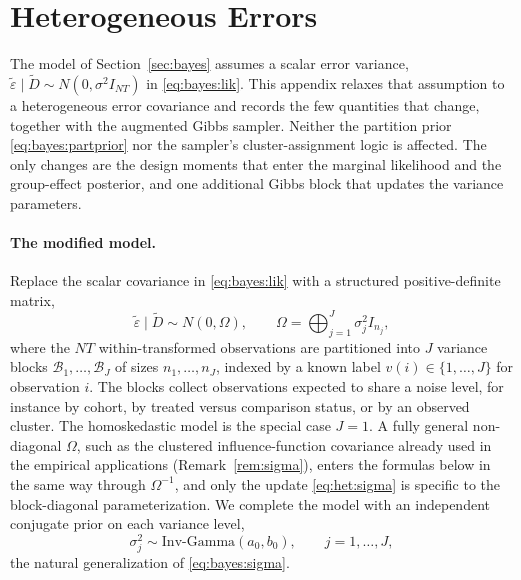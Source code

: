 \documentclass[margin=5in, 12pt]{article}
\newcommand{\1}{\mathbbm{1}}
\begin{document}
\section{Heterogeneous Errors}
\label{app:hetero}

The model of Section~\ref{sec:bayes} assumes a scalar error variance, $\tilde\varepsilon \mid \tilde D \sim N(0,\sigma^2 I_{NT})$ in \eqref{eq:bayes:lik}. This appendix relaxes that assumption to a heterogeneous error covariance and records the few quantities that change, together with the augmented Gibbs sampler. Neither the partition prior \eqref{eq:bayes:partprior} nor the sampler's cluster-assignment logic is affected. The only changes are the design moments that enter the marginal likelihood and the group-effect posterior, and one additional Gibbs block that updates the variance parameters.

\paragraph{The modified model.} Replace the scalar covariance in \eqref{eq:bayes:lik} with a structured positive-definite matrix,
\begin{equation}
  \tilde\varepsilon \mid \tilde D \sim N(0,\Omega), \qquad \Omega = \bigoplus_{j=1}^{J}\sigma_j^2 I_{n_j},
  \label{eq:het:cov}
\end{equation}
where the $NT$ within-transformed observations are partitioned into $J$ variance blocks $\mathcal B_1,\dots,\mathcal B_J$ of sizes $n_1,\dots,n_J$, indexed by a known label $v(i)\in\{1,\dots,J\}$ for observation $i$. The blocks collect observations expected to share a noise level, for instance by cohort, by treated versus comparison status, or by an observed cluster. The homoskedastic model is the special case $J=1$. A fully general non-diagonal $\Omega$, such as the clustered influence-function covariance already used in the empirical applications (Remark~\ref{rem:sigma}), enters the formulas below in the same way through $\Omega^{-1}$, and only the update \eqref{eq:het:sigma} is specific to the block-diagonal parameterization. We complete the model with an independent conjugate prior on each variance level,
\begin{equation}
  \sigma_j^2 \sim \mathrm{Inv\text{-}Gamma}(a_0,b_0), \qquad j=1,\dots,J,
  \label{eq:het:prior}
\end{equation}
the natural generalization of \eqref{eq:bayes:sigma}.
\end{document}
